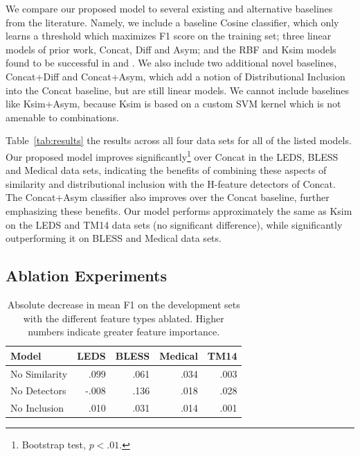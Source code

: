 We compare our proposed model to several existing and alternative baselines
from the literature. Namely, we include a baseline Cosine
classifier, which only learns a threshold which maximizes F1 score on the
training set; three linear models of prior work, Concat, Diff and Asym; and the
RBF and Ksim models found to be successful in
 and . We also include two additional
novel baselines, Concat+Diff and Concat+Asym, which add a notion of
Distributional Inclusion into the Concat baseline, but are still linear models.
We cannot include baselines like Ksim+Asym, because Ksim is based on a custom
SVM kernel which is not amenable to combinations.

Table~\ref{tab:results} the results across all four data sets for all of the
listed models. Our proposed model improves significantly\footnote{Bootstrap test, $p<.01$.} over Concat in the LEDS,
BLESS and Medical data sets, indicating the benefits of combining these aspects of
similarity and distributional inclusion with the H-feature detectors of Concat.
The Concat+Asym classifier also improves over the Concat baseline, further
emphasizing these benefits. Our model performs approximately the same as Ksim
on the LEDS and TM14 data sets (no significant difference),
while significantly outperforming it on BLESS and Medical data sets.

\subsection{Ablation Experiments}
\begin{table}
\centering
\begin{small}
\begin{tabular}{|l|rrrr|}
  \hline
  Model         &      LEDS   &      BLESS  &      Medical  &      TM14   \\
  \hline
  No Similarity &      .099   &      .061   &      .034     &      .003   \\
  No Detectors  &     -.008   &      .136   &      .018     &      .028   \\
  No Inclusion  &      .010   &      .031   &      .014     &      .001   \\
  \hline
\end{tabular}
\end{small}
\caption{Absolute decrease in mean F1 on the development sets with the
different feature types ablated. Higher numbers indicate greater feature
importance.}

\label{tab:ablation}
\end{table}

